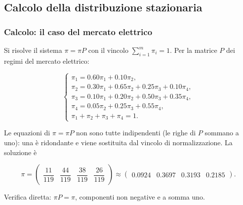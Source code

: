\documentclass[handout]{beamer}%
\providecommand{\QTR}[2]{\csname #1\endcsname{#2}}
\begin{document}


\subsection{Calcolo della distribuzione stazionaria}%

\begin{frame}%
%

\frametitle{Calcolo: il caso del mercato elettrico}%
%

%


Si risolve il sistema $\pi=\pi P$ con il vincolo $\sum_{i=1}^{m}\pi_{i}=1$.
Per la matrice $P$ dei regimi del mercato elettrico:%

\[%
\begin{cases}
\pi_{1} = 0.60\pi_{1}+0.10\pi_{2},\\
\pi_{2} = 0.30\pi_{1}+0.65\pi_{2}+0.25\pi_{3}+0.10\pi_{4},\\
\pi_{3} = 0.10\pi_{1}+0.20\pi_{2}+0.50\pi_{3}+0.35\pi_{4},\\
\pi_{4} = 0.05\pi_{2}+0.25\pi_{3}+0.55\pi_{4},\\
\pi_{1}+\pi_{2}+\pi_{3}+\pi_{4}=1.
\end{cases}
\]


Le equazioni di $\pi=\pi P$ non sono tutte indipendenti (le righe di $P$
sommano a uno): una \`{e} ridondante e viene sostituita dal vincolo di
normalizzazione. La soluzione \`{e}%

\[
\pi=
\begin{pmatrix}
\dfrac{11}{119} & \dfrac{44}{119} & \dfrac{38}{119} & \dfrac{26}{119}%
\end{pmatrix}
\approx%
\begin{pmatrix}
0.0924 & 0.3697 & 0.3193 & 0.2185
\end{pmatrix}
.
\]


\medskip

\begin{center}
{\small Verifica diretta: $\pi P=\pi$, componenti non negative e a somma uno.}
\end{center}%

\transboxout
\end{frame}%
\end{document}
